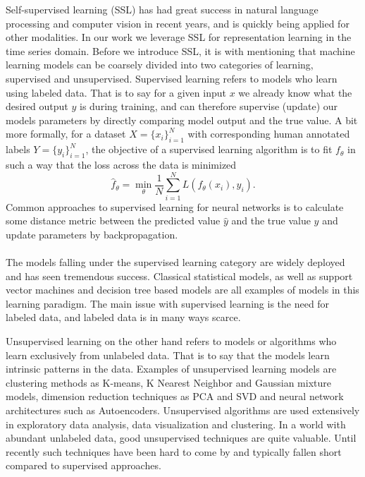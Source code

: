 \documentclass[../../thesis.tex]{subfiles}
\begin{document}
Self-supervised learning (SSL) has had great success in natural language processing and computer vision in recent years, and is quickly being applied for other modalities. In our work we leverage SSL for representation learning in the time series domain. Before we introduce SSL, it is with mentioning that machine learning models can be coarsely divided into two categories of learning, supervised and unsupervised. 
\newline
Supervised learning refers to models who learn using labeled data. That is to say for a given input $x$ we already know what the desired output $y$ is during training, and can therefore supervise (update) our models parameters by directly comparing model output and the true value. A bit more formally, for a dataset $X = \{x_i\}_{i=1}^N$ with corresponding human annotated labels $Y = \{y_i\}_{i=1}^N$, the objective of a supervised learning algorithm is to fit $f_\theta$ in such a way that the loss across the data is minimized
\begin{equation}
    \widehat{f}_\theta = \min_\theta \frac{1}{N} \sum_{i=1}^N L(f_\theta(x_i),y_i).
\end{equation}
Common approaches to supervised learning for neural networks is to calculate some distance metric between the predicted value $\widehat{y}$ and the true value $y$ and update parameters by backpropagation.\\\\
The models falling under the supervised learning category are widely deployed and has seen tremendous success. Classical statistical models, as well as support vector machines and decision tree based models are all examples of models in this learning paradigm. The main issue with supervised learning is the need for labeled data, and labeled data is in many ways scarce.
\newline

Unsupervised learning on the other hand refers to models or algorithms who learn exclusively from unlabeled data. That is to say that the models learn intrinsic patterns in the data. Examples of unsupervised learning models are clustering methods as K-means, K Nearest Neighbor and Gaussian mixture models, dimension reduction techniques as PCA and SVD and neural network architectures such as Autoencoders. Unsupervised algorithms are used extensively in exploratory data analysis, data visualization and clustering. In a world with abundant unlabeled data, good unsupervised techniques are quite valuable. Until recently such techniques have been hard to come by and typically fallen short compared to supervised approaches. 
\newline
\end{document}
